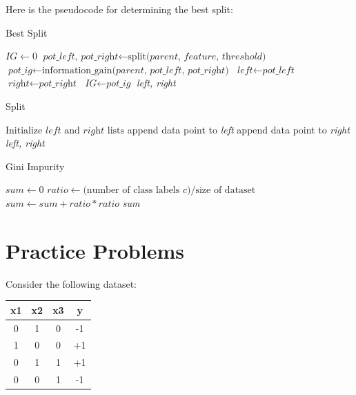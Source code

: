 \documentclass{article}
\begin{document}
Here is the pseudocode for determining the best split:

\begin{algorithm}
\caption{Best Split}\label{euclid}
\begin{algorithmic}[1]
\State $\textit{IG} \gets 0$
\State $\textit{pot\_left, pot\_right} \gets \text{split}\textit{(parent, feature, threshold)}$ 
\State $\textit{pot\_ig} \gets \text{information\_gain}\textit{(parent, pot\_left, pot\_right)}$
\State $\textit{left} \gets \textit{pot\_left}$
\State $\textit{right} \gets \textit{pot\_right}$
\State $\textit{IG} \gets \textit{pot\_ig}$
\EndIf
\EndFor
\EndFor
\State \Return \textit{left, right}
\end{algorithmic}
\end{algorithm}

\begin{algorithm}
\caption{Split}
\begin{algorithmic}[1]
\State $\text{Initialize }\textit{left}\text{ and }\textit{right}\text{ lists}$
\State append data point to \textit{left}
\Else
\State append data point to \textit{right}
\EndIf
\EndFor
\State \Return \textit{left, right}
\EndFunction
\end{algorithmic}
\end{algorithm}

\begin{algorithm}
\caption{Gini Impurity}
\begin{algorithmic}[1]
\State $\textit{sum} \gets 0$
\State $\textit{ratio} \gets \text{(number of class labels } \textit{c}\text{)} / \text{size of dataset}$
\State $\textit{sum} \gets \textit{sum} + \textit{ratio}*\textit{ratio}$
\EndFor
\State \Return {}\textit{sum}
\EndFunction
\end{algorithmic}
\end{algorithm}

\section{Practice Problems}
Consider the following dataset:
\begin{center}
\begin{tabular}{ |c|c|c|c| } 
\hline
x1 & x2 & x3 & y \\
\hline
0 & 1 & 0 & -1\\ 
1 & 0 & 0 & +1\\ 
0 & 1 & 1 & +1\\ 
0 & 0 & 1 & -1\\ 
\hline
\end{tabular}
\end{center}
        
\end{document}
